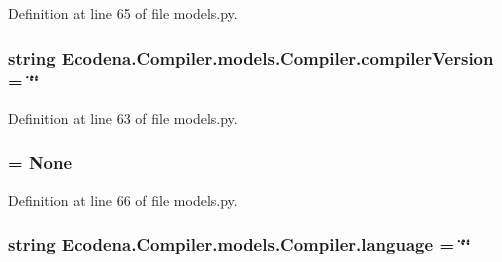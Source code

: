 Definition at line 65 of file models.py.

\hypertarget{class_ecodena_1_1_compiler_1_1models_1_1_compiler_aaf93790fadd78c7b65166de0be0215e7}{
\subsubsection[{compilerVersion}]{\setlength{\rightskip}{0pt plus 5cm}string {\bf Ecodena.Compiler.models.Compiler.compilerVersion} = \char`\"{}\char`\"{}}}
\label{d1/d44/class_ecodena_1_1_compiler_1_1models_1_1_compiler_aaf93790fadd78c7b65166de0be0215e7}


Definition at line 63 of file models.py.

\hypertarget{class_ecodena_1_1_compiler_1_1models_1_1_compiler_a1f6a19542290c2bb59174f9ce2aa7046}{
\subsubsection[{errorReport}]{ = None}}
\label{d1/d44/class_ecodena_1_1_compiler_1_1models_1_1_compiler_a1f6a19542290c2bb59174f9ce2aa7046}


Definition at line 66 of file models.py.

\hypertarget{class_ecodena_1_1_compiler_1_1models_1_1_compiler_a7f7abbdc4ae677a6e0d967a2970ec930}{
\subsubsection[{language}]{\setlength{\rightskip}{0pt plus 5cm}string {\bf Ecodena.Compiler.models.Compiler.language} = \char`\"{}\char`\"{}}}
\label{d1/d44/class_ecodena_1_1_compiler_1_1models_1_1_compiler_a7f7abbdc4ae677a6e0d967a2970ec930}


